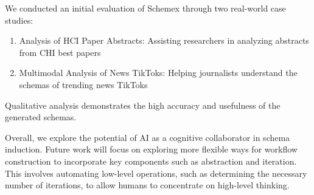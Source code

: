 We conducted an initial evaluation of Schemex through two real-world case studies:
\begin{enumerate}[noitemsep]
\item Analysis of HCI Paper Abstracts: Assisting researchers in analyzing abstracts from CHI best papers
\item Multimodal Analysis of News TikToks: Helping journalists understand the schemas of trending news TikToks
\end{enumerate}
Qualitative analysis demonstrates the high accuracy and usefulness of the generated schemas.

Overall, we explore the potential of AI as a cognitive collaborator in schema induction. 
Future work will focus on exploring more flexible ways for workflow construction to incorporate key components such as abstraction and iteration. 
This involves automating low-level operations, such as determining the necessary number of iterations, to allow humans to concentrate on high-level thinking.

